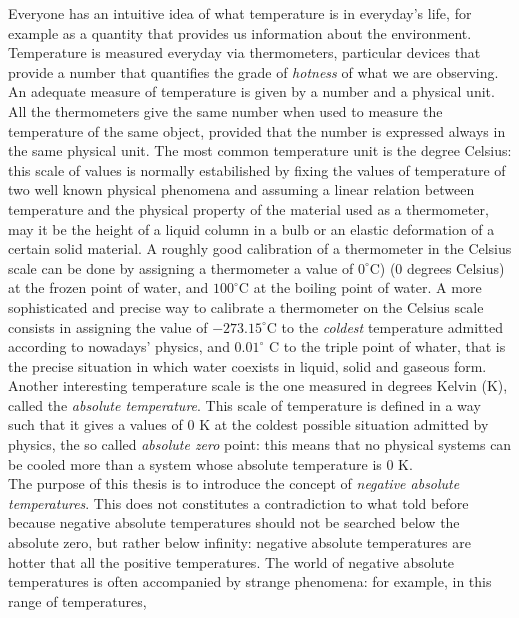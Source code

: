 Everyone has an intuitive idea of what temperature is in everyday's life, for example as a quantity that provides us information 
about the environment. \\ 
Temperature is measured everyday via thermometers, particular devices that provide a number that quantifies the grade of \emph{hotness} of what we are observing. \\
An adequate measure of temperature is given by a number and a physical unit. All the thermometers give the same number when used to measure the temperature of the same object, provided that 
the number is expressed always in the same physical unit. The most common temperature unit is the degree Celsius: this scale of values is normally estabilished by fixing the values of temperature of two well known
physical phenomena and assuming a linear relation between temperature and the physical property of the material used as a thermometer, may it be the height of a liquid column in a bulb or an elastic deformation of a certain solid material.
A roughly good calibration of a thermometer in the Celsius scale can be done by assigning a thermometer a value of $0^\circ$C) (0 degrees Celsius) at the frozen point of water, and $100^\circ$C at the boiling point of water. A more sophisticated and precise way to calibrate a thermometer 
on the Celsius scale consists in assigning the value of $-273.15^\circ$C to the \emph{coldest} temperature admitted according to nowadays' physics, and $0.01^\circ$ C to the triple point of whater, that 
is the precise situation in which water coexists in liquid, solid and gaseous form. \\
Another interesting temperature scale is the one measured in degrees Kelvin (K), called the \emph{absolute temperature}. This scale of temperature is 
defined in a way such that it gives a values of $0$ K at the coldest possible situation admitted by physics, the so called \emph{absolute zero} point: this means that no physical systems can be cooled more than a system 
whose absolute temperature is $0$ K. \\
The purpose of this thesis is to introduce the concept of \emph{negative absolute temperatures}. This does not constitutes a contradiction to what told before because negative absolute temperatures should not be searched below the absolute zero, but rather 
below infinity: negative absolute temperatures are hotter that all the positive temperatures. The world of negative absolute temperatures is often accompanied by strange phenomena: for example, in this range of temperatures,
